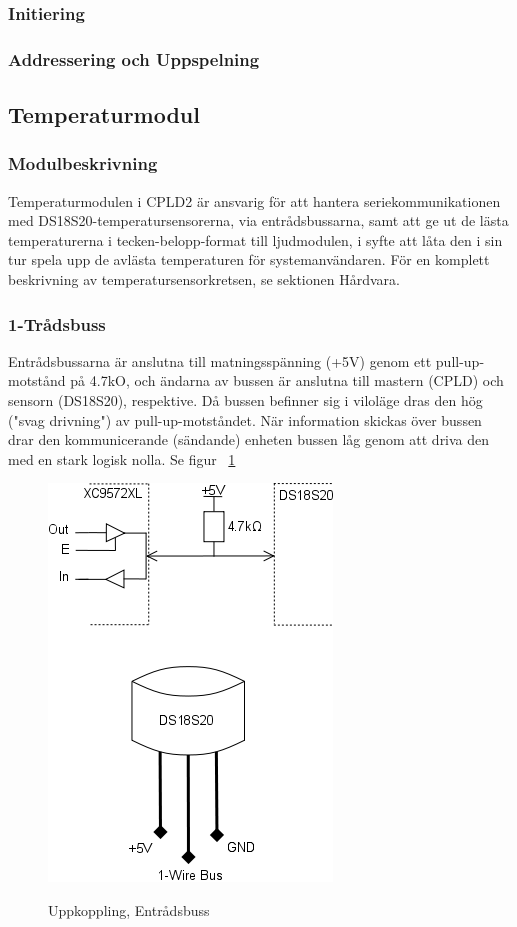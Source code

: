 \documentclass[a4paper,11pt]{article}
\begin{document}
		\subsubsection{Initiering}

		\subsubsection{Addressering och Uppspelning}

	\subsection{Temperaturmodul}

	\subsubsection{Modulbeskrivning}

	Temperaturmodulen i CPLD2 är ansvarig för att hantera seriekommunikationen med 
	DS18S20-temperatursensorerna, via entrådsbussarna, samt att ge ut de lästa temperaturerna
	i tecken-belopp-format till ljudmodulen, i syfte att låta den i sin tur spela upp de avlästa
	temperaturen för systemanvändaren. För en komplett beskrivning av temperatursensorkretsen, se sektionen Hårdvara.

	\subsubsection{1-Trådsbuss}

	Entrådsbussarna är anslutna till matningsspänning (+5V) genom ett pull-up-motstånd på 4.7kO, och
	ändarna av bussen är anslutna till mastern (CPLD) och sensorn (DS18S20), respektive. Då bussen
	befinner sig i viloläge dras den hög ("svag drivning") av pull-up-motståndet. När information
	skickas över bussen drar den kommunicerande (sändande) enheten bussen låg genom att driva den
	med en stark logisk nolla. Se figur ~\ref{fig:TempBus}

		\begin{figure}[ht!tb]
		  \centering
		      \includegraphics[scale=1, angle=0]{TempBus.png}
			\label{fig:TempBus}
		  	\caption{Uppkoppling, Entrådsbuss}
		\end{figure}
\end{document}
